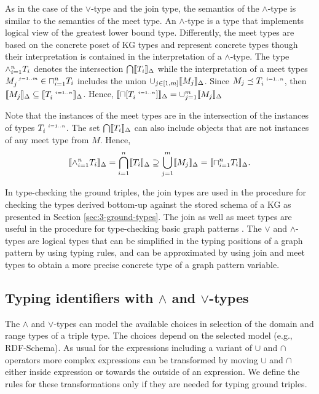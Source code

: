 \documentclass[runningheads]{llncs}
\newcommand{\s}{\scriptscriptstyle\ \,}
\newcommand{\llb}{\llbracket}
\newcommand{\rrb}{\rrbracket}
\begin{document}
As in the case of the $\lor$-type and the join type, the semantics of
the $\land$-type is similar to the semantics of the meet type. An
$\land$-type is a type that implements logical view of the greatest
lower bound type. Differently, the meet types are based on the
concrete poset of KG types and represent concrete types though their
interpretation is contained in the interpretation of a
$\land$-type. The type $\land_{i=1}^n\/T_i$ denotes the intersection
$\bigcap\/\llb\/T_i\rrb_\D$ while the interpretation of a meet types
$M_j^{\s\/j=1..m}\in\sqcap_{i=1}^n\/T_i$ includes the union
$\cup_{j\in[1,m]}\llb\/M_j\rrb_\D$. Since
$M_j\preceq\/T_i^{\s\/i=1..n}$, then
$\llb\/M_j\rrb_\D\subseteq\llb\/T_i^{\s\/i=1..n}\rrb_\D$. Hence,
$\llb\sqcap[T_i^{\s\/i=1..n}]\rrb_\D=\cup_{j=1}^m\llb\/M_j\rrb_\D$

Note that the instances of the meet types
are in the intersection of the instances of types
$T_i^{\s\/i=1..n}$. The set $\bigcap\/\llb\/T_i\rrb_\D$ can also
include objects that are not instances of any meet type from
$M$. Hence,
$$\llb\land_{i=1}^n\/T_i\rrb_\D=\bigcap_{i=1}^n\llb\/T_i\rrb_\D\supseteq\bigcup_{j=1}^m\llb\/M_j\rrb_\D=\llb\sqcap_{i=1}^n\/T_i\rrb_\D.$$

In type-checking the ground triples, the join types are used in the
procedure for checking the types derived bottom-up against the stored
schema of a KG as presented in Section \ref{sec:3-ground-types}. The
join as well as meet types are useful in the procedure for
type-checking basic graph patterns \cite{Savnik2025a}. The $\lor$ and
$\land$-types are logical types that can be simplified in the typing
positions of a graph pattern by using typing rules, and can be
approximated by using join and meet types to obtain a more precise
concrete type of a graph pattern variable.




\subsection{Typing identifiers with $\land$ and $\lor$-types}

The $\land$ and $\lor$-types can model the available choices in
selection of the domain and range types of a triple type. The choices
depend on the selected model (e.g., RDF-Schema). As usual for the
expressions including a variant of $\cup$ and $\cap$ operators more
complex expressions can be transformed by moving $\cup$ and $\cap$
either inside expression or towards the outside of an expression. We
define the rules for these transformations only if they are needed for
typing ground triples.
\end{document}
